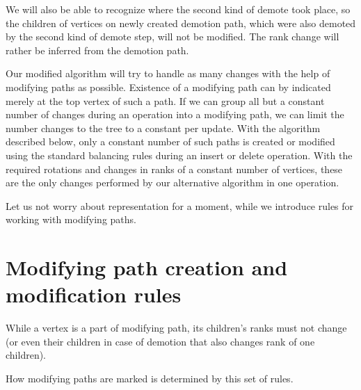 We will also be able to recognize where the second kind of demote took place, so the children of vertices on newly created demotion path, which were also demoted by the second kind of demote step, will not be modified. The rank change will rather be inferred from the demotion path. 

Our modified algorithm will try to handle as many changes with the help of modifying paths as possible. Existence of a modifying path can by indicated merely at the top vertex of such a path. If we can group all but a constant number of changes during an operation into a modifying path, we can limit the number changes to the tree to a constant per update. With the algorithm described below, only a constant number of such paths is created or modified using the standard balancing rules during an insert or delete operation. With the required rotations and changes in ranks of a constant number of vertices, these are the only changes performed by our alternative algorithm in one operation.

Let us not worry about representation for a moment, while we introduce rules for working with modifying paths.

\section{Modifying path creation and modification rules}

While a vertex is a part of modifying path, its children's ranks must not change (or even their children in case of demotion that also changes rank of one children). 

How modifying paths are marked is determined by this set of rules.

